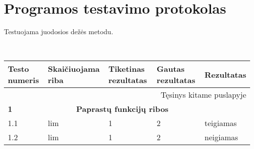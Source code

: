 \section{Programos testavimo protokolas}

Testuojama juodosios dežės metodu.


\begin{center}
    \newcommand*\rot{\rotatebox{90}}
    \newcommand{\x}{$\times$}
    \newcommand{\green}{\cellcolor{green!50}}
    \newcommand{\red}{\cellcolor{red!50}}
    \newcommand{\header}[2]{\textbf{#1} & \multicolumn{3}{c}{\textbf{#2}} & \\ \hline}
\
    \begin{longtable}{|m{}|m{}|m{}|m{}|m{}|}
    \hline
        \textbf{Testo numeris} & \textbf{Skaičiuojama riba} &\textbf{Tiketinas rezultatas} & \textbf{Gautas rezultatas} & \textbf{Rezultatas} \\ \hline
    \endhead
        \multicolumn{5}{|r|}{{Tęsinys kitame puslapyje}} \\ \hline
    \endfoot
    \hline \hline
    \endlastfoot
    \header{1}{Paprastų funkcijų ribos}
    1.1 & lim & 1 & 2  & \green teigiamas \\ \hline
    1.2 & lim & 1 & 2  & \red neigiamas \\ \hline
    

    \end{longtable}
\end{center}
